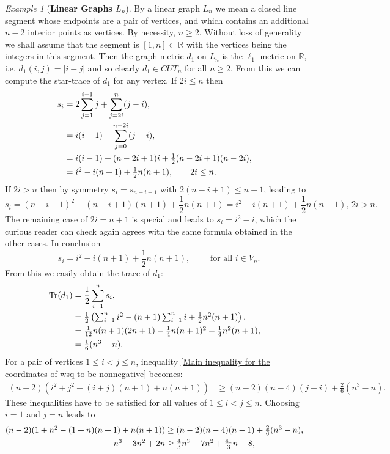 \documentclass[12pt]{amsart}
\numberwithin{theorem}{section}
\theoremstyle{remark}
\newtheorem{example}[theorem]{Example}
\begin{document}
\begin{example}[{\bf Linear Graphs $L_n$}] 
By a linear graph $L_n$ we mean a closed line segment whose endpoints are a pair of vertices, and which contains an additional $n-2$ interior points as vertices. By necessity, $n\ge 2$. Without loss of generality we shall assume that the segment is $[1,n]\subset \mathbb R$ with the vertices being the integers in this segment. Then the graph metric $d_1$ on $L_n$ is the $\ell_1$-metric on $\mathbb R$, i.e. $d_1(i,j) = |i-j|$ and so clearly $d_1\in CUT_n$ for all $n\ge 2$. From this we can compute the star-trace of $d_1$ for any vertex. If $2i\le n$ then 
\begin{align*}
s_i & = 2\sum_{j=1}^{i-1} j + \sum_{j=2i}^{n}(j-i), \cr 
& = i(i-1) + \sum_{j=0}^{n-2i}(j+i), \cr 
& \textstyle = i(i-1) + (n-2i+1)i + \frac{1}{2}(n-2i+1)(n-2i), \cr
& \textstyle  = i^2-i(n+1)+\frac{1}{2}n(n+1), \qquad 2i\le n. 
\end{align*}
If $2i>n$ then by symmetry $s_i = s_{n-i+1}$ with $2(n-i+1)\le n+1$, leading to 
$$\textstyle s_i = (n-i+1)^2 - (n-i+1)(n+1) + \frac{1}{2}n(n+1) = i^2-i(n+1)+\frac{1}{2}n(n+1), \, 2i>n.$$
The remaining case of $2i=n+1$ is special and leads to $s_i=i^2-i$, which the curious reader can check again agrees with the same formula obtained in the other cases. In conclusion
$$\textstyle  s_i = i^2-i(n+1)+\frac{1}{2}n(n+1), \qquad \text{ for all }i\in V_n.$$
From this we easily obtain the trace of $d_1$:
\begin{align*}
\text{Tr}(d_1)& = \frac{1}{2} \sum_{i=1}^n s_i, \cr
& \textstyle =  \frac{1}{2} \left( \sum_{i=1}^n i^2 - (n+1)\sum_{i=1}^n i + \frac{1}{2}n^2(n+1)\right), \cr 
& \textstyle = \frac{1}{12}n(n+1)(2n+1) -\frac{1}{4}n(n+1)^2+ \frac{1}{4}n^2(n+1), \cr 
& \textstyle  =  \frac{1}{6}(n^3-n).
\end{align*}
For a pair of vertices $1\le i<j\le n$, inequality \eqref{Main inequality for the coordinates of wsq to be nonnegative} becomes:
\begin{align*}
\textstyle (n-2)(i^2+j^2-(i+j)(n+1)+n(n+1)) & \textstyle\ge (n-2)(n-4)(j-i) + \frac{2}{6}(n^3-n).
\end{align*} 
These inequalities have to be satisfied for all values of $1\le i<j\le n$. Choosing $i=1$ and $j=n$ leads to 
\begin{align*}
\textstyle (n-2)(1+n^2-(1+n)(n+1)+n(n+1)) & \textstyle\ge (n-2)(n-4)(n-1) + \frac{2}{6}(n^3-n), \cr  
\textstyle n^3-3n^2+2n &\ge \textstyle \textstyle \frac{4}{3}n^3-7n^2+\frac{41}{3}n-8, \cr 

\end{align*}
\end{example}
\end{document}
